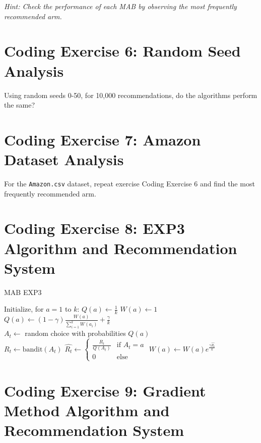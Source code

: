 \documentclass[
  letterpaper,
  DIV=11,
  numbers=noendperiod]{scrreprt}
\begin{document}
\emph{Hint: Check the performance of each MAB by observing the most
frequently recommended arm.}

\section{Coding Exercise 6: Random Seed
Analysis}\label{coding-exercise-6-random-seed-analysis}

Using random seeds 0-50, for 10,000 recommendations, do the algorithms
perform the same?

\section{Coding Exercise 7: Amazon Dataset
Analysis}\label{coding-exercise-7-amazon-dataset-analysis}

For the \texttt{Amazon.csv} dataset, repeat exercise Coding Exercise 6
and find the most frequently recommended arm.

\section{Coding Exercise 8: EXP3 Algorithm and Recommendation
System}\label{coding-exercise-8-exp3-algorithm-and-recommendation-system}

\begin{algorithm}[htb!]
\caption{MAB EXP3}
\begin{algorithmic}[1]
\State Initialize, for $a = 1$ to $k$:
\State $Q(a) \gets \frac{1}{k}$
\State $W(a) \gets 1$ \\
    \State $Q(a) \gets (1 - \gamma) \frac{W(a)}{\sum_{i=1}^{k} W(a_{i})} + \frac{\gamma}{k}$ \\
    \State $A_t \gets$ random choice with probabilities $Q(a)$ \\
    \State $R_t \gets \text{bandit}(A_t)$
    \State $\hat{R_t} \gets
        \begin{cases}
            \frac{R_t}{Q(A_t)} & \text{if } A_t = a\\
            0 & \text{else}
        \end{cases}$
    \State $W(a) \gets W(a) e^{\frac{\gamma \hat{R_t}}{k}}$
\Endfor
\end{algorithmic}
\end{algorithm}

\section{Coding Exercise 9: Gradient Method Algorithm and Recommendation
System}\label{coding-exercise-9-gradient-method-algorithm-and-recommendation-system}
\end{document}
